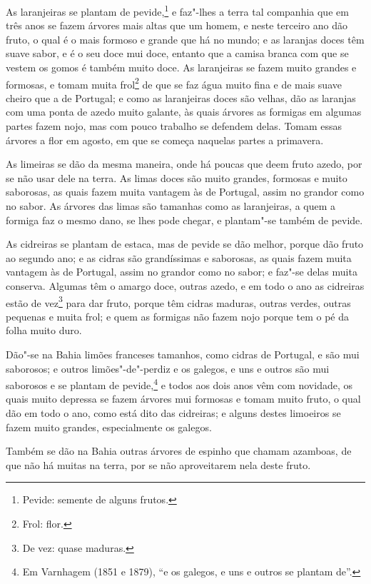 As laranjeiras se plantam de pevide,\footnote{ Pevide: semente de alguns frutos.} e
faz"-lhes a terra tal companhia que em três anos se fazem árvores mais altas que um homem,
e neste terceiro ano dão fruto, o qual é o mais formoso e grande que há no mundo; e as
laranjas doces têm suave sabor, e é o seu doce mui doce, entanto que a camisa branca com
que se vestem os gomos é também muito doce. As laranjeiras se fazem muito grandes e
formosas, e tomam muita frol\footnote{Frol: flor.} de que se faz água muito fina e de
mais suave cheiro que a de Portugal; e como as laranjeiras doces são velhas, dão as
laranjas com uma ponta de azedo muito galante, às quais árvores as formigas em algumas
partes fazem nojo, mas com pouco trabalho se defendem delas. Tomam essas árvores a flor em
agosto, em que se começa naquelas partes a primavera.

As limeiras se dão da mesma maneira, onde há poucas que deem fruto azedo, por se não usar
dele na terra. As limas doces são muito grandes, formosas e muito saborosas, as quais
fazem muita vantagem às de Portugal, assim no grandor como no sabor. As árvores das limas
são tamanhas como as laranjeiras, a quem a formiga faz o mesmo dano, se lhes pode chegar,
e plantam"-se também de pevide.

As cidreiras se plantam de estaca, mas de pevide se dão melhor, porque dão fruto ao
segundo ano; e as cidras são grandíssimas e saborosas, as quais fazem muita vantagem às de
Portugal, assim no grandor como no sabor; e faz"-se delas muita conserva. Algumas têm o
amargo doce, outras azedo, e em todo o ano as cidreiras estão de vez\footnote{ De vez:
quase maduras.} para dar fruto, porque têm cidras maduras, outras verdes, outras pequenas
e muita frol; e quem as formigas não fazem nojo porque tem o pé da folha muito duro.

Dão"-se na Bahia limões franceses tamanhos, como cidras de Portugal, e são mui saborosos; e
outros limões"-de"-perdiz e os galegos, e uns e outros são mui saborosos e se plantam de
pevide,\footnote{ Em Varnhagem (1851 e 1879), ``e os galegos, e uns e outros se plantam
de''.} e todos aos dois anos vêm com novidade, os quais muito depressa se fazem árvores
mui formosas e tomam muito fruto, o qual dão em todo o ano, como está dito das cidreiras;
e alguns destes limoeiros se fazem muito grandes, especialmente os galegos.

Também se dão na Bahia outras árvores de espinho que chamam azamboas, de que não há muitas
na terra, por se não aproveitarem nela deste fruto.

